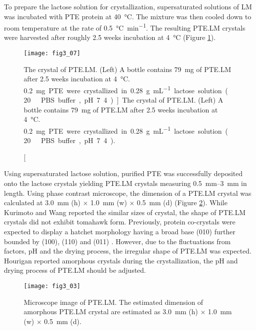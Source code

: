 \begin{refsection}
To prepare the lactose solution for crystallization, supersaturated
solutions of LM was incubated with PTE protein at \SI{40}{\celsius}. The
mixture was then cooled down to room temperature at the rate of
\SI{0.5}{\celsius\per\minute}. The resulting PTE.LM crystals were harvested
after roughly 2.5 weeks incubation at \SI{4}{\celsius} (Figure
\ref{fig:ptelm-bottle}). 
\begin{figure}[htbp] \centering \texttt{[image: fig3\_07]}
    \caption[The crystal of PTE.LM. (Left) A bottle contains
        \SI{79}{\mg} of PTE.LM after 2.5 weeks incubation at \SI{4}{\celsius}.
        \SI{0.2}mg PTE were crystallized in \SI{0.28}{\gram\per\mL} lactose
        solution (\SI{20}{\milli\Molar} PBS buffer, pH 7.4).]{The
            crystal of PTE.LM. (Left) A bottle contains \SI{79}{\mg} of PTE.LM
            after 2.5 weeks incubation at \SI{4}{\celsius}.  \SI{0.2}mg PTE
            were crystallized in \SI{0.28}{\gram\per\mL} lactose solution
            (\SI{20}{\milli\Molar} PBS buffer, pH 7.4).}
        \label{fig:ptelm-bottle} 
\end{figure}

Using supersaturated lactose solution, purified PTE was successfully deposited
onto the lactose crystals yielding PTE.LM crystals measuring
\SIrange{0.5}{3}{\mm} in length. Using phase contrast microscope, the dimension
of a PTE.LM crystal was calculated at \SI{3.0}{\mm} (h) $\times$ \SI{1.0}{\mm}
(w) $\times$ \SI{0.5}{\mm} (d) (Figure \ref{fig:ptelm-image}). While Kurimoto
 \cite{Kurimoto1999} and Wang  \cite{Wang2001a}
reported the similar sizes of crystal, the shape of PTE.LM crystals did not
exhibit tomahawk form. Previously, protein co-crystals were expected to display
a hatchet morphology having a broad base (010) further bounded by (100), (110)
and (011) \cite{Kurimoto1999}.  However, due to the fluctuations from factors,
pH and the drying process, the irregular shape of PTE.LM was expected. Hourigan
 reported amorphous crystals during the crystallization, the pH
and drying process of PTE.LM should be adjusted. 
\begin{figure}[h!] \centering \texttt{[image: fig3\_03]} 
    \caption[Microscope image of PTE.LM. The estimated dimension of amorphous
    PTE.LM crystal are estimated as  \SI{3.0}{\mm} (h) $\times$ \SI{1.0}{\mm}
(w) $\times$ \SI{0.5}{\mm} (d).]{Microscope image of PTE.LM. The estimated
    dimension of amorphous PTE.LM crystal are estimated as  \SI{3.0}{\mm} (h)
    $\times$ \SI{1.0}{\mm} (w) $\times$ \SI{0.5}{\mm} (d).}
    \label{fig:ptelm-image} 
\end{figure}


\end{refsection}
